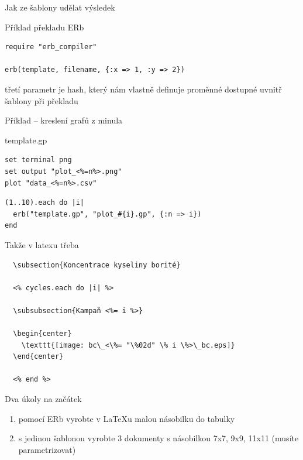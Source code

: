 \documentclass{beamer}
\begin{document}
\begin{frame}[fragile]{Jak ze šablony udělat výsledek}
  \scriptsize
  \begin{block}{Příklad překladu ERb}
    \scriptsize
    \begin{verbatim}
require "erb_compiler"

erb(template, filename, {:x => 1, :y => 2})
    \end{verbatim}
  \end{block}
  třetí parametr je hash, který nám vlastně definuje proměnné dostupné uvnitř šablony při překladu
\end{frame}

\begin{frame}[fragile]{Příklad -- kreslení grafů z minula}
  \begin{block}{template.gp}
    \scriptsize
    \begin{verbatim}
set terminal png
set output "plot_<%=n%>.png"
plot "data_<%=n%>.csv"
    \end{verbatim}
  \end{block}
  \begin{block}{}
    \scriptsize
    \begin{verbatim}
(1..10).each do |i|
  erb("template.gp", "plot_#{i}.gp", {:n => i})
end
    \end{verbatim}
  \end{block}
\end{frame}

\begin{frame}[fragile]{Takže v latexu třeba}
\scriptsize
\begin{verbatim}
  \subsection{Koncentrace kyseliny borité}

  <% cycles.each do |i| %>

  \subsubsection{Kampaň <%= i %>}

  \begin{center}
    \texttt{[image: bc\_<\%= "\%02d" \% i \%>\_bc.eps]}
  \end{center}

  <% end %>
\end{verbatim}
\end{frame}

\begin{frame}{Dva úkoly na začátek}
  \begin{enumerate}
    \item pomocí ERb vyrobte v LaTeXu malou násobilku do tabulky
    \item s jedinou šablonou vyrobte 3 dokumenty s násobilkou 7x7, 9x9, 11x11 (musíte parametrizovat)
  \end{enumerate}
\end{frame}
\end{document}
